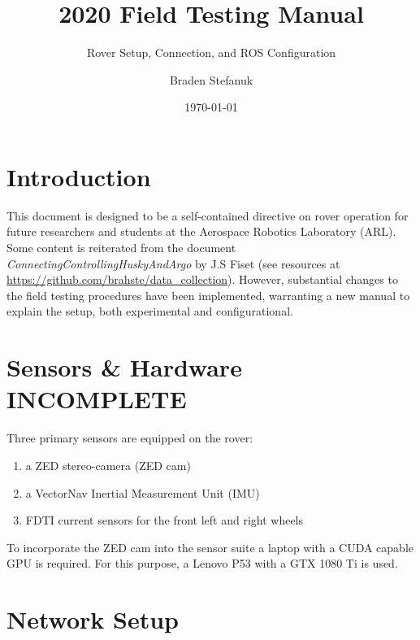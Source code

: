 \documentclass[
	12pt, %
]{fphw}
\title{2020 Field Testing Manual} %
\subtitle{Rover Setup, Connection, and ROS Configuration}
\author{Braden Stefanuk} %
\date{\today} %
\institute{Areospace Robotics Laboratory} %
\begin{document}
\maketitle %


\section{Introduction}

This document is designed to be a self-contained directive on rover operation for future researchers and students at the Aerospace Robotics Laboratory (ARL). Some content is reiterated from the document \textit{ConnectingControllingHuskyAndArgo} by J.S Fiset (see resources at \url{https://github.com/brahste/data_collection}). However, substantial changes to the field testing procedures have been implemented, warranting a new manual to explain the setup, both experimental and configurational.


\section{Sensors \& Hardware INCOMPLETE}
\label{sec:SensorsAndHardware}

Three primary sensors are equipped on the rover:
\begin{enumerate}
\item a ZED stereo-camera (ZED cam)
\item a VectorNav Inertial Measurement Unit (IMU)
\item FDTI current sensors for the front left and right wheels
\end{enumerate}
To incorporate the ZED cam into the sensor suite a laptop with a CUDA capable GPU is required. For this purpose, a Lenovo P53 with a GTX 1080 Ti is used.


\section{Network Setup}
\end{document}
